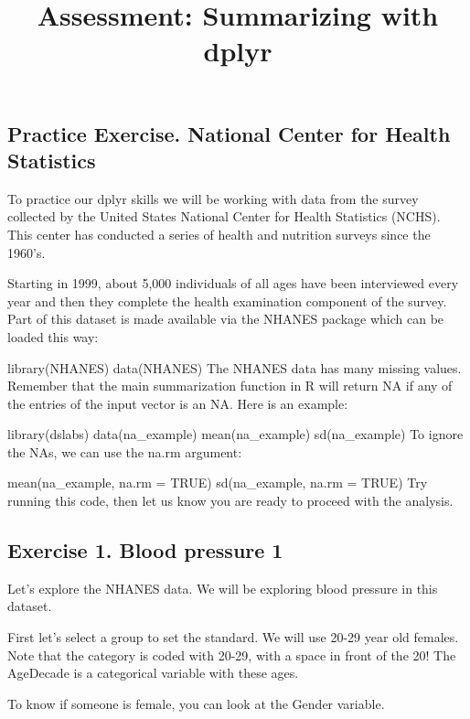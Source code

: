 \documentclass[
]{article}
\title{Assessment: Summarizing with dplyr}
\author{}
\date{\vspace{-2.5em}}
\begin{document}
\maketitle

\hypertarget{practice-exercise.-national-center-for-health-statistics}{%
\subsection{Practice Exercise. National Center for Health
Statistics}\label{practice-exercise.-national-center-for-health-statistics}}

To practice our dplyr skills we will be working with data from the
survey collected by the United States National Center for Health
Statistics (NCHS). This center has conducted a series of health and
nutrition surveys since the 1960's.

Starting in 1999, about 5,000 individuals of all ages have been
interviewed every year and then they complete the health examination
component of the survey. Part of this dataset is made available via the
NHANES package which can be loaded this way:

library(NHANES) data(NHANES) The NHANES data has many missing values.
Remember that the main summarization function in R will return NA if any
of the entries of the input vector is an NA. Here is an example:

library(dslabs) data(na\_example) mean(na\_example) sd(na\_example) To
ignore the NAs, we can use the na.rm argument:

mean(na\_example, na.rm = TRUE) sd(na\_example, na.rm = TRUE) Try
running this code, then let us know you are ready to proceed with the
analysis.

\hypertarget{exercise-1.-blood-pressure-1}{%
\subsection{Exercise 1. Blood pressure
1}\label{exercise-1.-blood-pressure-1}}

Let's explore the NHANES data. We will be exploring blood pressure in
this dataset.

First let's select a group to set the standard. We will use 20-29 year
old females. Note that the category is coded with 20-29, with a space in
front of the 20! The AgeDecade is a categorical variable with these
ages.

To know if someone is female, you can look at the Gender variable.
\end{document}
